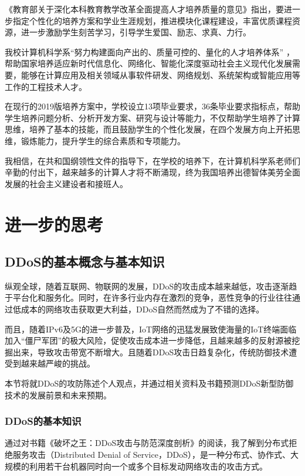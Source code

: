 \documentclass{article}
\begin{document}
《教育部关于深化本科教育教学改革全面提高人才培养质量的意见》\cite{ref4}指出，要进一步指定个性化的培养方案和学业生涯规划，推进模块化课程建设，丰富优质课程资源，进一步激励学生刻苦学习，引导学生爱国、励志、求真、力行。

我校计算机科学系“努力构建面向产出的、质量可控的、量化的人才培养体系” \cite{ref5}，帮助国家培养适应新时代信息化、网络化、智能化深度驱动社会主义现代化发展需要，能够在计算应用及相关领域从事软件研发、网络规划、系统架构或智能应用等工作的工程技术人才。

在现行的2019版培养方案中，学校设立13项毕业要求，36条毕业要求指标点，帮助学生培养问题分析、分析开发方案、研究与设计等能力，不仅帮助学生培养了计算思维，培养了基本的技能，而且鼓励学生的个性化发展，在四个发展方向上开拓思维，锻炼能力，提升学生的综合素质和专项能力。

我相信，在共和国纲领性文件的指导下，在学校的培养下，在计算机科学系老师们辛勤的付出下，越来越多的计算人才将不断涌现，终为我国培养出德智体美劳全面发展的社会主义建设者和接班人。

\section{进一步的思考}

\subsection{DDoS的基本概念与基本知识}

纵观全球，随着互联网、物联网的发展，DDoS的攻击成本越来越低，攻击逐渐趋于平台化和服务化。同时，在许多行业内存在激烈的竞争，恶性竞争的行业往往通过低成本的网络攻击获取更大利益，DDoS自然而然成为了不错的选择。

而且，随着IPv6及5G的进一步普及，IoT网络的迅猛发展致使海量的IoT终端面临加入“僵尸军团”的极大风险，促使攻击成本进一步降低，且越来越多的反射源被挖掘出来，导致攻击带宽不断增大。且随着DDoS攻击日趋复杂化，传统防御技术遭受到越来越严峻的挑战。

本节将就DDoS的攻防陈述个人观点，并通过相关资料及书籍预测DDoS新型防御技术的发展前景和未来预期。

\subsubsection{DDoS的基本知识}

通过对书籍《破坏之王：DDoS攻击与防范深度剖析》\cite{ref6}的阅读，我了解到分布式拒绝服务攻击（Distributed Denial of Service，DDoS），是一种分布式、协作式、大规模的利用若干台机器同时向一个或多个目标发动网络攻击的攻击方式。
\end{document}
